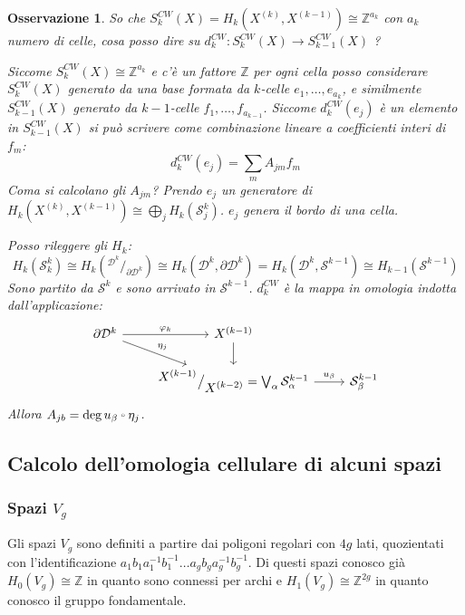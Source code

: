\documentclass[10pt, twoside=false, x11names]{scrbook}
\newtheorem{osservation}[theorem]{Osservazione}
\newcommand{\Z}{\mathbb{Z}}
\newcommand{\Sph}[1][]{\mathcal{S}^#1}
\newcommand{\Disk}[1][]{\mathcal{D}^#1}
\newcommand*\quot[2]{{^{\textstyle #1}\big/_{\textstyle #2}}}
\let\latexcirc=\circ
\newcommand{\ccirc}{\mathbin{\mathchoice
  {\xcirc\scriptstyle}
  {\xcirc\scriptstyle}
  {\xcirc\scriptscriptstyle}
  {\xcirc\scriptscriptstyle}
}}
\newcommand{\xcirc}[1]{\vcenter{\hbox{$#1\latexcirc$}}}
\let\circ\ccirc
\let\phi\varphi
\begin{document}
\begin{osservation}
  So che $ S_k^{CW}(X) = H_k(X^{(k)}, X^{(k-1)}) \cong \Z^{a_k} $ con $ a_k $ numero di celle,
  cosa posso dire su $ d_k^{CW} \colon S_k^{CW}(X) \to S_{k-1}^{CW}(X) $ ?

  Siccome $ S_k^{CW}(X) \cong \Z^{a_k} $ e c'è un fattore $ \Z $ per ogni cella
  posso considerare $ S_k^{CW}(X) $ generato da una base formata da
  $ k $-celle $ e_1, \dots, e_{a_k} $, e similmente $ S_{k-1}^{CW}(X) $ generato
  da $ k - 1 $-celle $ f_1, \dots, f_{a_{k-1}} $. Siccome $ d_k^{CW}(e_j) $ è un elemento in
  $ S_{k-1}^{CW}(X) $ si può scrivere come combinazione lineare a coefficienti interi di $ f_m $:
  \[
    d^{CW}_k (e_j) = \sum_m A_{jm}f_m
  \]
  Coma si calcolano gli $ A_{jm} $?
  Prendo $ e_j $ un generatore di $ H_k(X^{(k)}, X^{(k-1)}) \cong \bigoplus_j H_k(\Sph{k}_j) $.
  $ e_j $ genera il bordo di una cella.

  Posso rileggere gli $ H_k $:
  \[
    H_k(\Sph{k}_k) \cong H_k(\quot{\Disk{k}}{\partial \Disk{k}}) \cong H_k(\Disk{k}, \partial \Disk{k}) =
    H_k(\Disk{k}, \Sph{k-1}) \cong H_{k-1}(\Sph{k-1})
  \]
  Sono partito da $ \Sph{k} $ e sono arrivato in $ \Sph{k-1} $.
  $ d_k^{CW} $ è la mappa in omologia indotta dall'applicazione:
  \[
    \begin{tikzcd}
      \partial \Disk{k} \rar{\phi_k} \arrow{dr}{\eta_j} & X^{(k-1)} \dar & {}\\
      {} & \quot{X^{(k-1)}}{X^{(k-2)}} = \bigvee_\alpha \Sph{k-1}_\alpha \rar{u_\beta} & \Sph{k-1}_\beta
    \end{tikzcd}
  \]
  Allora $ A_{jb} = \deg{u_\beta \circ \eta_j} $.
\end{osservation}


\subsection{Calcolo dell'omologia cellulare di alcuni spazi}

\subsubsection{Spazi $ V_g $}

Gli spazi $ V_g $ sono definiti a partire dai poligoni
regolari con $ 4g $ lati, quozientati con l'identificazione
$ a_1 b_1 a_1^{-1} b_1^{-1} \dots a_g b_g a_g^{-1} b_g^{-1} $.
Di questi spazi conosco già $ H_0(V_g) \cong \Z $ in quanto
sono connessi per archi e $ H_1(V_g) \cong \Z^{2g} $ in quanto
conosco il gruppo fondamentale.
\end{document}
